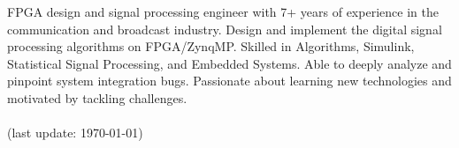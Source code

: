 \documentclass[localFont]{awesome-source-cv} %
\begin{document}
\makecvheader

\par{
    FPGA design and signal processing engineer with 7+ years of experience in the communication 
    and broadcast industry. Design and implement the digital signal processing algorithms on FPGA/ZynqMP.
    Skilled in Algorithms, Simulink, Statistical Signal Processing, and Embedded Systems.
    Able to deeply analyze and pinpoint system integration bugs. Passionate about learning 
    new technologies and motivated by tackling challenges.
    \\
}
\noindent \\
(last update: \today)
\end{document}
